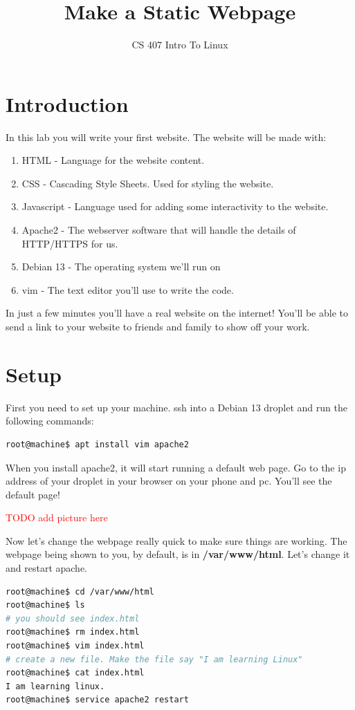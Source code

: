 \documentclass[12pt]{article}
\title{Make a Static Webpage}
\author{CS 407 Intro To Linux}
\begin{document}
\maketitle

\section{Introduction}
In this lab you will write your first website. The website will be made with:
\begin{enumerate}
    \item HTML - Language for the website content.
    \item CSS - Cascading Style Sheets. Used for styling the website.
    \item Javascript - Language used for adding some interactivity to the website.
    \item Apache2 - The webserver software that will handle the details of HTTP/HTTPS for us.
    \item Debian 13 - The operating system we'll run on
    \item vim - The text editor you'll use to write the code.
\end{enumerate}

In just a few minutes you'll have a real website on the internet! You'll be able to send a link to your website to friends and family to show off your work.

\section{Setup}
First you need to set up your machine. ssh into a Debian 13 droplet and run the following commands:
\begin{lstlisting}[language=bash]
root@machine$ apt install vim apache2
\end{lstlisting}

When you install apache2, it will start running a default web page. Go to the ip address of your droplet in your browser on your phone and pc. You'll see the default page!

\textcolor{red}{TODO add picture here}

Now let's change the webpage really quick to make sure things are working. The webpage being shown to you, by default, is in \textbf{/var/www/html}. Let's change it and restart apache.


\begin{lstlisting}[language=bash]
root@machine$ cd /var/www/html
root@machine$ ls
# you should see index.html
root@machine$ rm index.html
root@machine$ vim index.html
# create a new file. Make the file say "I am learning Linux"
root@machine$ cat index.html
I am learning linux.
root@machine$ service apache2 restart
\end{lstlisting}
\end{document}

